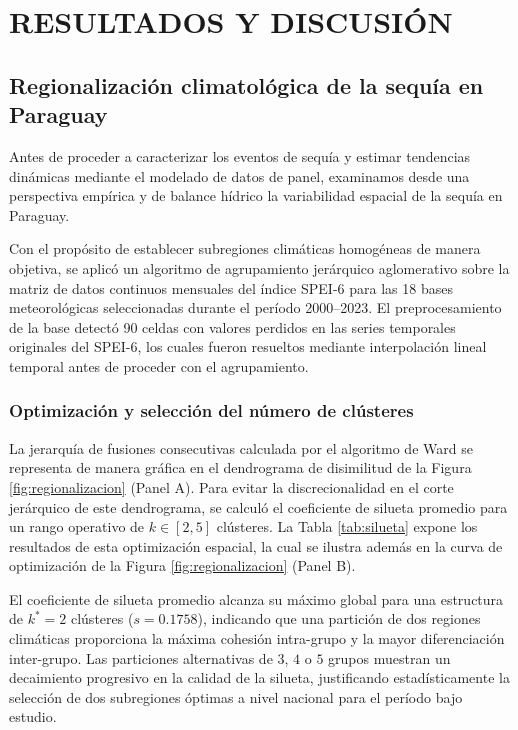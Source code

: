 \chapter{RESULTADOS Y DISCUSIÓN}

\section{Regionalización climatológica de la sequía en Paraguay}

Antes de proceder a caracterizar los eventos de sequía y estimar tendencias dinámicas mediante el modelado de datos de panel, examinamos desde una perspectiva empírica y de balance hídrico la variabilidad espacial de la sequía en Paraguay.

Con el propósito de establecer subregiones climáticas homogéneas de manera objetiva, se aplicó un algoritmo de agrupamiento jerárquico aglomerativo sobre la matriz de datos continuos mensuales del índice SPEI-6 para las 18 bases meteorológicas seleccionadas durante el período 2000--2023. El preprocesamiento de la base detectó 90 celdas con valores perdidos en las series temporales originales del SPEI-6, los cuales fueron resueltos mediante interpolación lineal temporal antes de proceder con el agrupamiento.

\subsection{Optimización y selección del número de clústeres}

La jerarquía de fusiones consecutivas calculada por el algoritmo de Ward se representa de manera gráfica en el dendrograma de disimilitud de la Figura \ref{fig:regionalizacion} (Panel A). Para evitar la discrecionalidad en el corte jerárquico de este dendrograma, se calculó el coeficiente de silueta promedio para un rango operativo de $k \in [2, 5]$ clústeres. La Tabla \ref{tab:silueta} expone los resultados de esta optimización espacial, la cual se ilustra además en la curva de optimización de la Figura \ref{fig:regionalizacion} (Panel B).

El coeficiente de silueta promedio alcanza su máximo global para una estructura de $k^* = 2$ clústeres ($s = 0.1758$), indicando que una partición de dos regiones climáticas proporciona la máxima cohesión intra-grupo y la mayor diferenciación inter-grupo. Las particiones alternativas de $3$, $4$ o $5$ grupos muestran un decaimiento progresivo en la calidad de la silueta, justificando estadísticamente la selección de dos subregiones óptimas a nivel nacional para el período bajo estudio.

